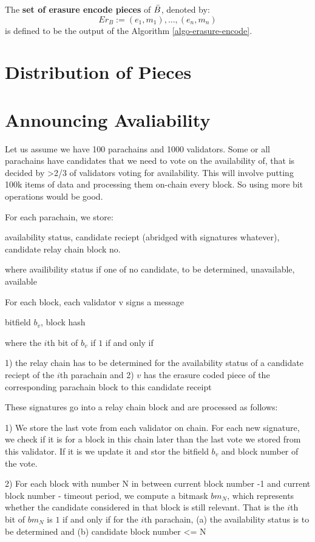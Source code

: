 \begin{definition}
  \label{defn-erauser-coded-pieces} 
  The {\bf set of erasure encode pieces} of $\bar{B}$, denoted by: 
  \[
   Er_B := {(e_1, m_1),...,(e_n,m_n)}
   \]
   is defined to be the output of the Algorithm \ref{algo-erasure-encode}.
\end{definition}

\section{Distribution of Pieces}\label{distribute-piece}

\section{Announcing Avaliability}\label{voting}

Let us assume we have 100 parachains and 1000 validators. Some or all parachains have candidates that we need to vote on the availability of, that is decided by >2/3 of validators voting for availability. This will involve putting 100k items of data and processing them on-chain every block. So using more bit operations would be good.

For each parachain, we store:

availability status, candidate reciept (abridged with signatures whatever), candidate relay chain block no.

where availibility status if one of {no candidate, to be determined, unavailable, available}

For each block, each validator v signs a message

bitfield $b_v$, block hash

where the $i$th bit of $b_v$ if $1$ if and only if 

1) the relay chain has to be determined for the availability status of a candidate reciept of the $i$th parachain and 
2) $v$ has the erasure coded piece of the corresponding parachain block to this candidate receipt

These signatures go into a relay chain block and are processed as follows:

1) We store the last vote from each validator on chain. For each new signature, we check if it is for a block in this chain later than the last vote we stored from this validator. If it is we update it and stor the bitfield $b_v$ and block number of the vote.

2) For each block with number N in between current block number -1 and current block number - timeout period, we compute a bitmask $bm_N$, which represents whether the candidate considered in that block is still relevant. That is the $i$th bit of $bm_N$ is $1$ if and only if for the $i$th parachain, 
    (a) the availability status is to be determined and
    (b) candidate block number <= N
    
